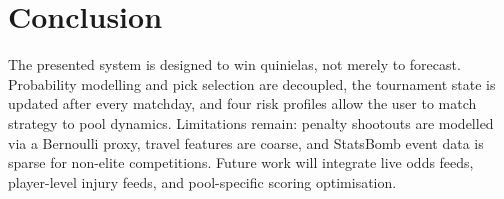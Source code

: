 \section{Conclusion}
The presented system is designed to win quinielas, not merely to forecast.
Probability modelling and pick selection are decoupled, the tournament state
is updated after every matchday, and four risk profiles allow the user to
match strategy to pool dynamics. Limitations remain: penalty shootouts are
modelled via a Bernoulli proxy, travel features are coarse, and StatsBomb
event data is sparse for non-elite competitions. Future work will integrate
live odds feeds, player-level injury feeds, and pool-specific scoring
optimisation.
